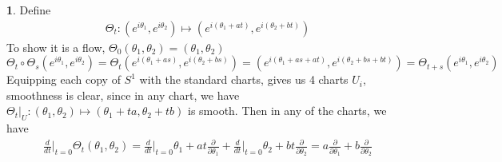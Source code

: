 \documentclass[10.5pt]{article}
\theoremstyle{definition}
\newtheorem{pb}{}
\begin{document}
    \begin{pb}
        Define
        \begin{align*}
            \Theta_t: (e^{i\theta_1}, e^{i\theta_2}) \mapsto (e^{i(\theta_1 + at)},e^{i(\theta_2 + bt)})
        \end{align*}
        To show it is a flow, \(\Theta_0(\theta_1, \theta_2) = (\theta_1, \theta_2)\)
        \[\Theta_t \circ \Theta_s (e^{i\theta_1}, e^{i\theta_2}) = \Theta_t(e^{i(\theta_1 + as)},e^{i(\theta_2 + bs)}) 
        = (e^{i(\theta_1 + as + at)},e^{i(\theta_2 + bs + bt)}) = \Theta_{t+s} (e^{i\theta_1}, e^{i\theta_2})\]
        Equipping each copy of \(S^1\) with the standard charts, gives us 4 charts \(U_i\), smoothness is clear, since in any chart, 
        we have \(\Theta_t\vert_U : (\theta_1,\theta_2) \mapsto (\theta_1+ta,\theta_2+tb)\) is smooth. Then in any of the charts, we have
        \begin{align*}
            \frac{d}{dt}\vert_{t=0} \Theta_t(\theta_1,\theta_2) = \frac{d}{dt}\vert_{t=0} \theta_1 + at \frac{\partial}{\partial \theta_1} + \frac{d}{dt}\vert_{t=0} \theta_2 + bt \frac{\partial}{\partial \theta_2}
            = a\frac{\partial}{\partial \theta_1} + b\frac{\partial}{\partial \theta_2}
        \end{align*}
    \end{pb}
\end{document}
